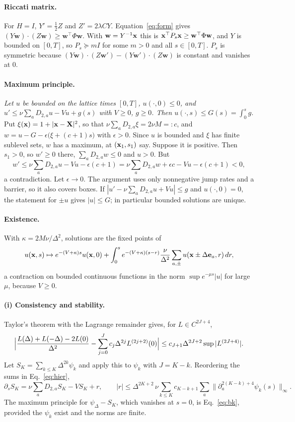 \paragraph{Riccati matrix.}
For $H=I$, $Y'=\tfrac12Z$ and $Z'=2\lambda CY$. Equation~\eqref{eq:form} gives
$(Y\mathbf w)\cdot(Z\mathbf w)\ge\mathbf w^\top\Phi\mathbf w$. With $\mathbf w=Y^{-1}\mathbf x$ this is
$\mathbf x^\top P_s\mathbf x\ge\mathbf w^\top\Phi\mathbf w$, and $Y$ is bounded on $[0,T]$, so $P_s\succeq mI$
for some $m>0$ and all $s\in[0,T]$. $P_s$ is symmetric because
$(Y\mathbf w)\cdot(Z\mathbf w')-(Y\mathbf w')\cdot(Z\mathbf w)$ is constant and vanishes at $0$.

\paragraph{Maximum principle.}
\emph{Let $u$ be bounded on the lattice times $[0,T]$, $u(\cdot,0)\le0$, and
$u'\le\nu\sum_aD_{2,a}u-Vu+g(s)$ with $V\ge0$, $g\ge0$. Then $u(\cdot,s)\le G(s)=\int_0^sg$.}
Put $\xi(\mathbf x)=1+|\mathbf x-\mathbf X|^2$, so that $\nu\sum_aD_{2,a}\xi=2\nu M=:c$, and
$w=u-G-\epsilon\bigl(\xi+(c+1)s\bigr)$ with $\epsilon>0$. Since $u$ is bounded and $\xi$ has
finite sublevel sets, $w$ has a maximum, at $(\mathbf x_1,s_1)$ say. Suppose it is positive. Then
$s_1>0$, so $w'\ge0$ there, $\sum_aD_{2,a}w\le0$ and $u>0$. But
\[
 w'\le\nu\sum_aD_{2,a}u-Vu-\epsilon(c+1)=\nu\sum_aD_{2,a}w+\epsilon c-Vu-\epsilon(c+1)<0 ,
\]
a contradiction. Let $\epsilon\to0$. The argument uses only nonnegative jump rates and a
barrier, so it also covers boxes. If
$|u'-\nu\sum_aD_{2,a}u+Vu|\le g$ and $u(\cdot,0)=0$, the statement for $\pm u$ gives $|u|\le G$; in particular bounded solutions are unique.

\paragraph{Existence.}
With $\kappa=2M\nu/\Delta^2$, solutions are the fixed points of
\[
 u(\mathbf x,s)\mapsto e^{-(V+\kappa)s}u(\mathbf x,0)
 +\int_0^se^{-(V+\kappa)(s-r)}\frac\nu{\Delta^2}\sum_{a,\pm}u(\mathbf x\pm\Delta\mathbf e_a,r)\,dr,
\]
a contraction on bounded continuous functions in the norm $\sup e^{-\mu s}|u|$ for large $\mu$,
because $V\ge0$.

\paragraph{(i) Consistency and stability.}
Taylor's theorem with the Lagrange remainder gives, for $L\in C^{2J+4}$,
\[
 \Bigl|\frac{L(\Delta)+L(-\Delta)-2L(0)}{\Delta^2}-\sum_{j=0}^Jc_j\Delta^{2j}L^{(2j+2)}(0)\Bigr|
 \le c_{J+1}\Delta^{2J+2}\sup|L^{(2J+4)}| .
\]
Let $S_K=\sum_{k\le K}\Delta^{2k}\psi_k$ and apply this to $\psi_k$ with $J=K-k$. Reordering the
sums in Eq.~\eqref{eq:hier},
\[
 \partial_sS_K=\nu\sum_aD_{2,a}S_K-VS_K+r,\qquad
 |r|\le\Delta^{2K+2}\,\nu\sum_{k\le K}c_{K-k+1}\sum_a\bigl\|\partial_a^{2(K-k)+4}\psi_k(s)\bigr\|_\infty .
\]
The maximum principle for $\psi_\Delta-S_K$, which vanishes at $s=0$, is
Eq.~\eqref{eq:bk}, provided the $\psi_k$ exist and the norms are finite.

